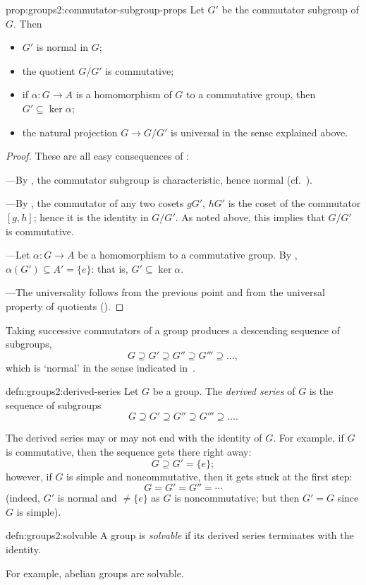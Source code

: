\begin{prop}{}{prop:groups2:commutator-subgroup-props}
  Let $G'$ be the commutator subgroup of $G$. Then
  \begin{itemize}
  \item $G'$ is normal in $G$;
  \item the quotient $G/G'$ is commutative;
  \item if $\alpha : G \to A$ is a homomorphism of $G$ to a
    commutative group, then $G' \subseteq \ker\alpha$;
  \item the natural projection $G \to G/G'$ is universal in the sense
    explained above.
  \end{itemize}
\end{prop}
\begin{proof}
  These are all easy consequences of
  :

  ---By , the commutator
  subgroup is characteristic, hence normal (cf.\
  ).

  ---By , the commutator of
  any two cosets $gG'$, $hG'$ is the coset of the commutator $[g,h]$;
  hence it is the identity in $G/G'$. As noted above, this implies
  that $G/G'$ is commutative.

  ---Let $\alpha : G \to A$ be a homomorphism to a commutative
  group. By ,
  $\alpha(G') \subseteq A' = \{e\}$: that is,
  $G' \subseteq \ker\alpha$.

  ---The universality follows from the previous point and from the
  universal property of quotients
  ().
\end{proof}
Taking successive commutators of a group produces a descending
sequence of subgroups,
\[
  G \supseteq G' \supseteq G'' \supseteq G''' \supseteq \dots,
\]
which is `normal' in the sense indicated
in~.
\begin{defn}{}{defn:groups2:derived-series}
  Let $G$ be a group. The \emph{derived series} of $G$ is the sequence
  of subgroups
  \[
    G \supseteq G' \supseteq G'' \supseteq G''' \supseteq \dots.
  \]
\end{defn}
The derived series may or may not end with the identity of $G$. For
example, if $G$ is commutative, then the sequence gets there right
away:
\[
  G \supseteq G' = \{e\};
\]
however, if $G$ is simple and noncommutative, then it gets stuck at
the first step:
\[
  G = G' = G'' = \cdots
\]
(indeed, $G'$ is normal and $\neq \{e\}$ as $G$ is noncommutative; but
then $G' = G$ since $G$ is simple).
\begin{defn}{}{defn:groups2:solvable}
  A group is \emph{solvable} if its derived series terminates with the
  identity.
\end{defn}
For example, abelian groups are solvable.

